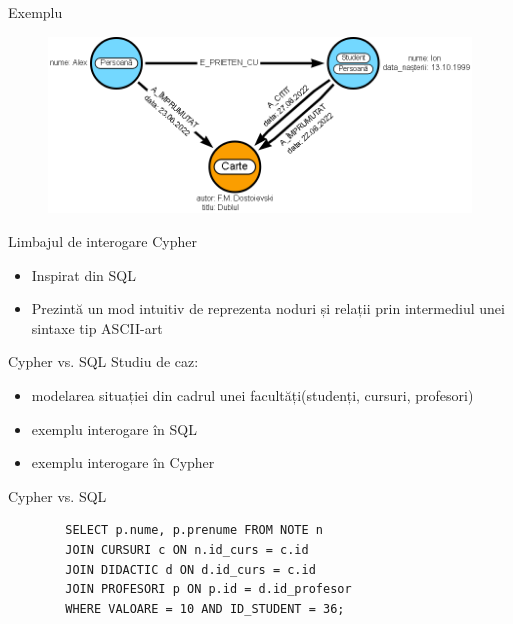 \documentclass{beamer}
\begin{document}
\begin{frame}[fragile]{Exemplu}
    \begin{figure}[H]
        \centering
        \begin{adjustbox}{max size={\textwidth}{\textheight}}
        \includegraphics[scale = 0.4]{exemplu_1}
        \end{adjustbox}
    \end{figure}
\end{frame}

\begin{frame}{Limbajul de interogare Cypher}
    \begin{itemize}
        \item Inspirat din SQL
        \item Prezintă un mod intuitiv de reprezenta noduri și relații prin intermediul unei sintaxe tip ASCII-art
    \end{itemize}
\end{frame}

\begin{frame}{Cypher vs. SQL}
    Studiu de caz:
    \begin{itemize}
        \item modelarea situației din cadrul unei facultăți(studenți, cursuri, profesori)
        \item exemplu interogare în SQL
        \item exemplu interogare în Cypher
    \end{itemize}
\end{frame}


\begin{frame}[fragile]{Cypher vs. SQL}
    \centering
    \begin{BVerbatim}
        SELECT p.nume, p.prenume FROM NOTE n 
        JOIN CURSURI c ON n.id_curs = c.id
        JOIN DIDACTIC d ON d.id_curs = c.id
        JOIN PROFESORI p ON p.id = d.id_profesor
        WHERE VALOARE = 10 AND ID_STUDENT = 36;
    \end{BVerbatim}
\end{frame}
\end{document}
